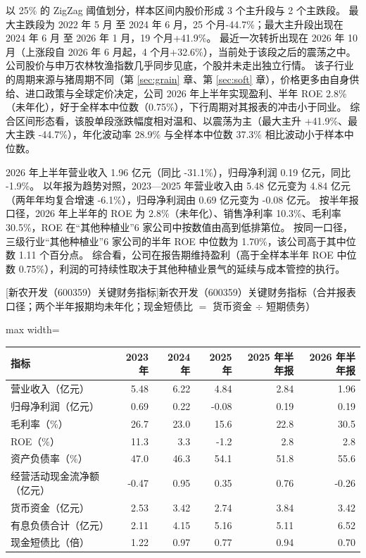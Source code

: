  以 25\% 的 ZigZag 阈值划分，样本区间内股价形成 3 个主升段与 2 个主跌段。 最大主跌段为 2022 年 5 月 至 2024 年 6 月，25 个月-44.7\%；最大主升段出现在 2024 年 6 月 至 2026 年 1 月，19 个月+41.9\%。 最近一次转折出现在 2026 年 10 月（上涨段自 2026 年 6 月起，4 个月+32.6\%），当前处于该段之后的震荡之中。 公司股价与申万农林牧渔指数几乎同步见底，个股并未走出独立行情。 该子行业的周期来源与猪周期不同（第 \ref{sec:grain} 章、第 \ref{sec:soft} 章），价格更多由自身供给、进口政策与全球定价决定，公司 2026 年上半年实现盈利、半年 ROE 2.8\%（未年化），好于全样本中位数（0.75\%），下行周期对其报表的冲击小于同业。 综合区间形态看，该股单段涨跌幅度相对温和、以震荡为主（最大主升 +41.9\%、最大主跌 -44.7\%），年化波动率 28.9\% 与全样本中位数 37.3\% 相比波动小于样本中位数。

 2026 年上半年营业收入 1.96 亿元（同比 -31.1\%），归母净利润 0.19 亿元，同比 -1.9\%。 以年报为趋势对照，2023---2025 年营业收入由 5.48 亿元变为 4.84 亿元（两年年均复合增速 -6.1\%），归母净利润由 0.69 亿元变为 -0.08 亿元。 按半年报口径，2026 年上半年的 ROE 为 2.8\%（未年化）、销售净利率 10.3\%、毛利率 30.5\%，ROE 在“其他种植业”6 家公司中按数值由高到低排第位。 按同一口径，三级行业“其他种植业”6 家公司的半年 ROE 中位数为 1.70\%，该公司高于其中位数 1.11 个百分点。 综合看，公司在报告期维持盈利（高于全样本半年 ROE 中位数 0.75\%），利润的可持续性取决于其他种植业景气的延续与成本管控的执行。

\begin{center}\small\setlength{\tabcolsep}{3.4pt}
[新农开发（600359）关键财务指标]{新农开发（600359）关键财务指标（合并报表口径；两个半年报期均未年化；现金短债比 $=$ 货币资金 $\div$ 短期债务）}
\begin{adjustbox}{max width=\textwidth}
\begin{tabular}{@{}lrrrrr@{}}
\toprule
指标 & 2023 年 & 2024 年 & 2025 年 & 2025 年半年报 & 2026 年半年报 \\
\midrule
营业收入（亿元） & 5.48 & 6.22 & 4.84 & 2.84 & 1.96 \\
归母净利润（亿元） & 0.69 & 0.22 & -0.08 & 0.19 & 0.19 \\
毛利率（\%） & 26.7 & 23.0 & 15.6 & 22.8 & 30.5 \\
ROE（\%） & 11.3 & 3.3 & -1.2 & 2.8 & 2.8 \\
资产负债率（\%） & 47.0 & 46.3 & 54.1 & 51.8 & 55.6 \\
经营活动现金流净额（亿元） & -0.47 & 0.95 & 0.35 & 0.76 & -0.26 \\
货币资金（亿元） & 2.53 & 3.42 & 2.74 & 3.84 & 3.42 \\
有息负债合计（亿元） & 2.11 & 4.15 & 5.16 & 5.11 & 6.52 \\
现金短债比（倍） & 1.22 & 0.97 & 0.77 & 0.94 & 0.70 \\
\bottomrule
\end{tabular}
\end{adjustbox}
\end{center}

